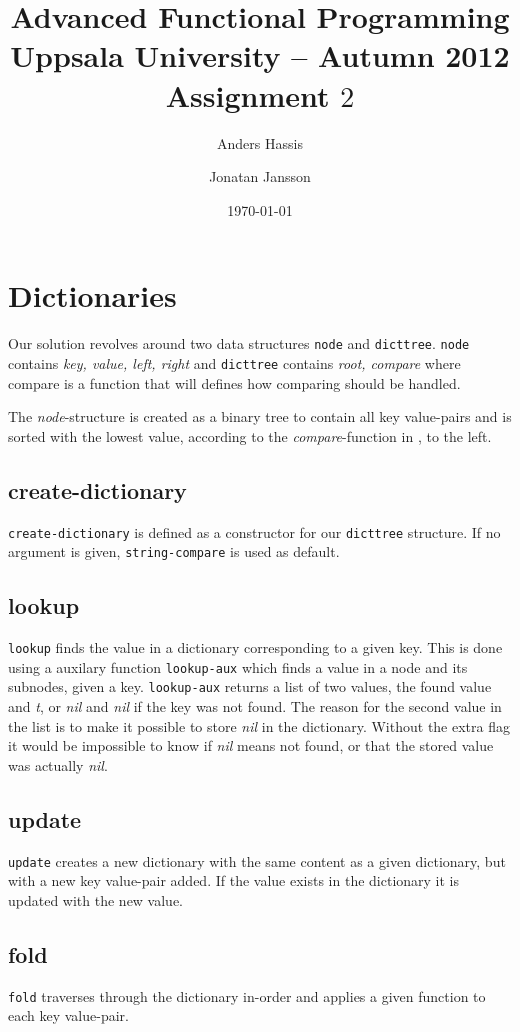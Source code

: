 \documentclass[a4paper,11pt]{article}
\title{\textbf{Advanced Functional Programming \\
    Uppsala University -- Autumn 2012 \\
    Assignment $2$ %
  }
}
\author{Anders Hassis \and Jonatan Jansson}
\date{\today}
\begin{document}
\maketitle

\section{Dictionaries}

Our solution revolves around two data structures \texttt{node} and \texttt{dicttree}. \texttt{node} contains \emph{key, value, left, right} and \texttt{dicttree} contains \emph{root, compare} where compare is a function that will defines how comparing should be handled.

The \emph{node}-structure is created as a binary tree to contain all key value-pairs and is sorted with the lowest value, according to the \emph{compare}-function in , to the left.

\subsection{create-dictionary}
\texttt{create-dictionary} is defined as a constructor for our \texttt{dicttree} structure. If no argument is given, \texttt{string-compare} is used as default.

\subsection{lookup}
\texttt{lookup} finds the value in a dictionary corresponding to a given key. This is done using a auxilary function \texttt{lookup-aux} which finds a value in a node and its subnodes, given a key. \texttt{lookup-aux} returns a list of two values, the found value and \emph{t}, or \emph{nil} and \emph{nil} if the key was not found. The reason for the second value in the list is to make it possible to store \emph{nil} in the dictionary. Without the extra flag it would be impossible to know if \emph{nil} means not found, or that the stored value was actually \emph{nil}.

\subsection{update}
\texttt{update} creates a new dictionary with the same content as a given dictionary, but with a new key value-pair added. If the value exists in the dictionary it is updated with the new value.

\subsection{fold}
\texttt{fold} traverses through the dictionary in-order and applies a given function to each key value-pair.
\end{document}
